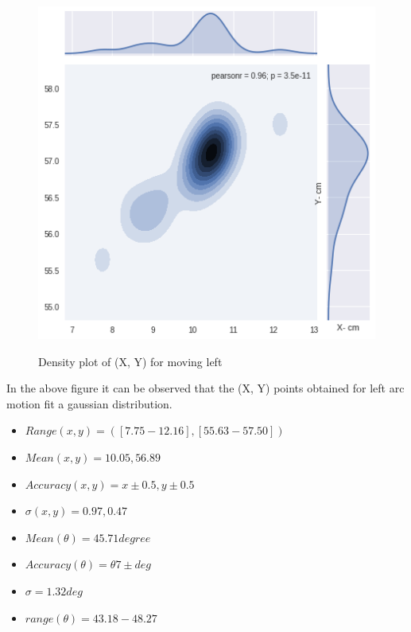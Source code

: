 \documentclass[11pt,a4paper]{article}
\begin{document}
\begin{itemize}
\begin{figure}[H]
\centering	
\includegraphics[width=1.0\linewidth]{leftG}
\label{fig:sub1}
\caption{Density plot of (X, Y) for moving left}
\end{figure}

In the above figure it can be observed that the (X, Y) points obtained for left arc motion fit a gaussian distribution.
\begin{itemize}
\item $ Range (x,y) =([7.75-12.16],[55.63-57.50])  $
\item $ Mean (x, y) = 10.05,56.89$
\item $ Accuracy (x,y) = x \pm0.5 , y \pm0.5  $ 
\item $ \sigma (x, y)= 0.97, 0.47 $
\item $ Mean(\theta) = 45.71 degree$
\item $ Accuracy (\theta)= \theta 7\pm  deg $
\item $ \sigma = 1.32 deg$
\item $ range (\theta) = 43.18 - 48.27 $
\end{itemize}
\end{itemize}
\end{document}
